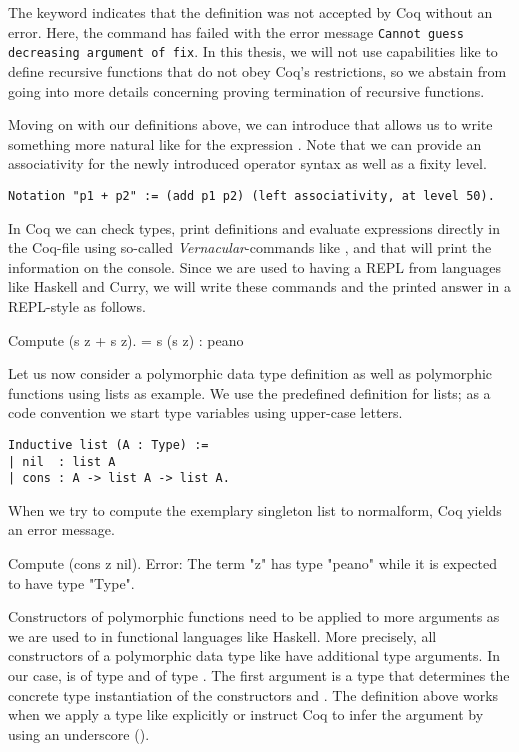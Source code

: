 The keyword  indicates that the definition was not accepted by Coq without an error.
Here, the command has failed with the error message \texttt{Cannot guess decreasing argument of fix}.
In this thesis, we will not use capabilities like  to define recursive functions that do not obey Coq's restrictions, so we abstain from going into more details concerning proving termination of recursive functions.

Moving on with our definitions above, we can introduce 
that allows us to write something more natural like  for
the expression .
Note that we can provide an associativity for the newly introduced operator syntax as well as a fixity level.

\begin{verbatim}
Notation "p1 + p2" := (add p1 p2) (left associativity, at level 50).
\end{verbatim}

In Coq we can check types, print definitions and evaluate expressions directly in the Coq-file using so-called \emph{Vernacular}-commands like ,  and  that will print the information on the console.
Since we are used to having a REPL from languages like Haskell and Curry, we will write these commands and the printed answer in a REPL-style as follows.

\begin{crepl}
\coqrepl Compute (s z + s z).
   = s (s z)
   : peano
\end{crepl}

Let us now consider a polymorphic data type definition as well as polymorphic functions using lists as example.
We use the predefined definition for lists; as a code convention we start type variables using upper-case letters.

\begin{verbatim}
Inductive list (A : Type) :=
| nil  : list A
| cons : A -> list A -> list A.
\end{verbatim}

When we try to compute the exemplary singleton list  to normalform, Coq yields an error message.

\begin{crepl}
\coqrepl Compute (cons z nil).
Error: The term "z" has type "peano" while it is expected to have type
       "Type".
\end{crepl}

Constructors of polymorphic functions need to be applied to more arguments as we are used to in functional languages like Haskell.
More precisely, all constructors of a polymorphic data type like  have additional type arguments.
In our case,  is of type  and  of type .
The first argument is a type that determines the concrete type instantiation of the constructors  and .
The definition above works when we apply a type like  explicitly or instruct Coq to infer the argument by using an underscore (\cinl{_}).

